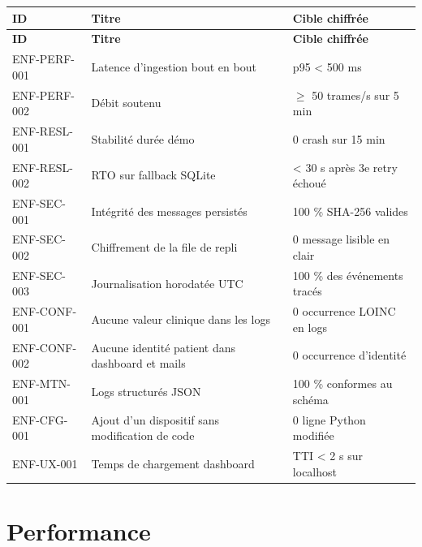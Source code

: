 \bridgezebra
\begin{longtable}{p{2.8cm}p{6.8cm}p{5.5cm}}
  \toprule
  \rowcolor{bridgeblue!90}
  {\color{white}\bfseries ID} & {\color{white}\bfseries Titre} & {\color{white}\bfseries Cible chiffrée} \\
  \midrule
  \endfirsthead
  \toprule
  \rowcolor{bridgeblue!90}
  {\color{white}\bfseries ID} & {\color{white}\bfseries Titre} & {\color{white}\bfseries Cible chiffrée} \\
  \midrule
  \endhead
  \bottomrule
  \endfoot
  ENF-PERF-001 & Latence d'ingestion bout en bout                        & p95 < 500 ms                          \\
  ENF-PERF-002 & Débit soutenu                                           & $\geq$ 50 trames/s sur 5 min          \\
  ENF-RESL-001 & Stabilité durée démo                                    & 0 crash sur 15 min                    \\
  ENF-RESL-002 & RTO sur fallback SQLite                                 & < 30 s après 3e retry échoué          \\
  ENF-SEC-001  & Intégrité des messages persistés                        & 100 \% SHA-256 valides                \\
  ENF-SEC-002  & Chiffrement de la file de repli                         & 0 message lisible en clair            \\
  ENF-SEC-003  & Journalisation horodatée UTC                            & 100 \% des événements tracés          \\
  ENF-CONF-001 & Aucune valeur clinique dans les logs                    & 0 occurrence LOINC en logs            \\
  ENF-CONF-002 & Aucune identité patient dans dashboard et mails         & 0 occurrence d'identité               \\
  ENF-MTN-001  & Logs structurés JSON                                    & 100 \% conformes au schéma            \\
  ENF-CFG-001  & Ajout d'un dispositif sans modification de code         & 0 ligne Python modifiée               \\
  ENF-UX-001   & Temps de chargement dashboard                           & TTI < 2 s sur localhost               \\
\end{longtable}

\section{Performance}
\label{sec:enf-performance}

